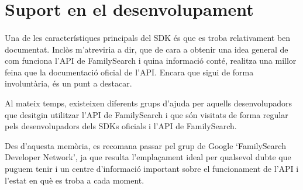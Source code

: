 \section{Suport en el desenvolupament}

    \paragraph{}
    Una de les característiques principals del SDK és que es troba relativament ben documentat. Inclòs m'atreviria a dir, que de cara a obtenir una idea general de com funciona l’API de FamilySearch i quina informació conté, realitza una millor feina que la documentació oficial de l’API. Encara que sigui de forma involuntària, és un punt a destacar.

    Al mateix temps, existeixen diferents grups d'ajuda per aquells desenvolupadors que desitgin utilitzar l'API de FamilySearch i que són visitats de forma regular pels desenvolupadors dels SDKs oficials i l’API de FamilySearch.

    Des d'aquesta memòria, es recomana passar pel grup de Google `FamilySearch Developer Network', ja que resulta l'emplaçament ideal per qualsevol dubte que puguem tenir i un centre d'informació important sobre el funcionament de l’API i l'estat en què es troba a cada moment.
